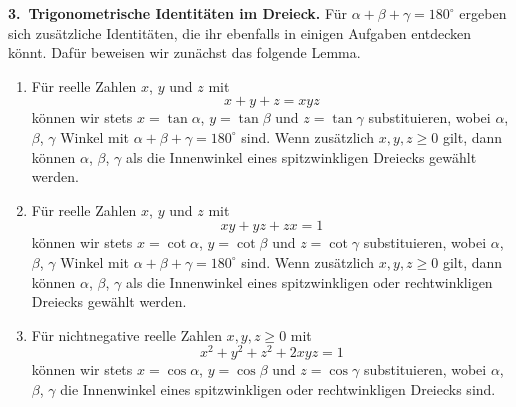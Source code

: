 \textbf{3.~Trigonometrische Identitäten im Dreieck.} Für $\alpha+\beta+\gamma=180^\circ$ ergeben sich zusätzliche Identitäten, die ihr ebenfalls in einigen Aufgaben entdecken könnt. Dafür beweisen wir zunächst das folgende Lemma.
\begin{satzmitnamen}[Lemma]\leavevmode
	\begin{enumerate}[label={$(\alph*)$},ref={$(\alph*)$}]
		\item \label{behauptung:DreieckTangensIdentitaet}Für reelle Zahlen $x$, $y$ und $z$ mit
		\begin{equation*}
			x+y+z=xyz
		\end{equation*}
		können wir stets $x=\tan \alpha$, $y=\tan\beta$ und $z=\tan\gamma$ substituieren, wobei $\alpha$, $\beta$, $\gamma$  Winkel mit $\alpha+\beta+\gamma=180^\circ$ sind. Wenn zusätzlich $x,y,z\geqslant 0$ gilt, dann können $\alpha$, $\beta$, $\gamma$ als die Innenwinkel eines spitzwinkligen Dreiecks gewählt werden.
		\item \label{behauptung:DreieckCotangensIdentitaet}Für reelle Zahlen $x$, $y$ und $z$ mit 
		\begin{equation*}
			xy+yz+zx=1
		\end{equation*}
		können wir stets $x=\cot\alpha$, $y=\cot\beta$ und $z=\cot\gamma$ substituieren, wobei $\alpha$, $\beta$, $\gamma$  Winkel  mit $\alpha+\beta+\gamma=180^\circ$ sind. Wenn zusätzlich $x,y,z\geqslant 0$ gilt, dann können $\alpha$, $\beta$, $\gamma$ als die Innenwinkel eines spitzwinkligen oder rechtwinkligen Dreiecks gewählt werden.
		\item \label{behauptung:DreieckCosinusIdentitaet} Für nichtnegative reelle Zahlen $x,y,z\geqslant 0$ mit
		\begin{equation*}
			x^2+y^2+z^2+2xyz=1
		\end{equation*}
		können wir stets $x=\cos\alpha$, $y=\cos\beta$ und $z=\cos\gamma$ substituieren, wobei $\alpha$, $\beta$, $\gamma$ die Innenwinkel eines spitzwinkligen oder rechtwinkligen Dreiecks sind.
	\end{enumerate}
\end{satzmitnamen}

